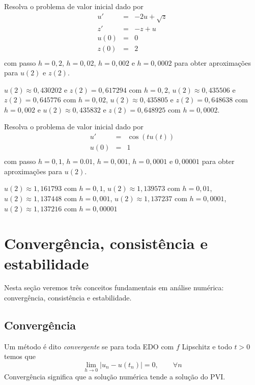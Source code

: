 \begin{exer}Resolva o problema de valor inicial dado por
\begin{eqnarray*}
u'&=& -2u + \sqrt{z}\\
z'&=& -z + u\\
u(0)&=&0\\
z(0)&=&2\\
\end{eqnarray*}
com passo $h=0,2$, $h=0,02$, $h=0,002$ e $h=0,0002$ para obter aproximações para $u(2)$ e $z(2)$.
\end{exer}
\begin{resp}

$u(2)\approx 0,430202$ e $z(2)=0,617294$ com $h=0,2$,
$u(2)\approx 0,435506$ e $z(2)=0,645776$ com $h=0,02$,
$u(2)\approx 0,435805$ e $z(2)=0,648638$ com $h=0,002$ e
$u(2)\approx 0,435832$ e $z(2)=0,648925$ com $h=0,0002$.

\end{resp}

\begin{exer}Resolva o problema de valor inicial dado por
\begin{eqnarray*}
u'&=& \cos(tu(t))\\
u(0)&=&1\\
\end{eqnarray*}
com passo $h=0,1$, $h=0.01$, $h=0,001$, $h=0,0001$ e $0,00001$ para obter aproximações para $u(2)$.
\end{exer}
\begin{resp}

$u(2)\approx 1,161793$ com $h=0,1$,
$u(2)\approx 1,139573$ com $h=0,01$,
$u(2)\approx 1,137448$ com $h=0,001$,
$u(2)\approx 1,137237$ com $h=0,0001$,
$u(2)\approx 1,137216$ com $h=0,00001$
\end{resp}


\section{Convergência, consistência e estabilidade}
Nesta seção veremos três conceitos fundamentais em análise numérica: convergência, consistência e estabilidade.

\subsection{Convergência}
Um método é dito \emph{convergente} se para toda EDO com $f$ Lipschitz e todo $t>0$ temos que
$$ \lim_{h \rightarrow 0} |u_n - u(t_n)| =0, \quad \quad \forall n$$
Convergência significa que a solução numérica tende a solução do PVI.


